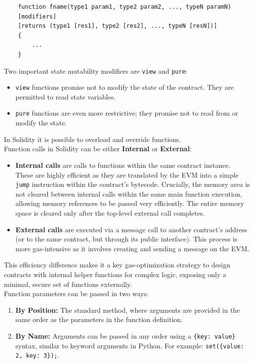 \documentclass{scrbook}
\begin{document}
\begin{lstlisting}
    function fname(type1 param1, type2 param2, ..., typeN paramN)
    [modifiers]
    [returns (type1 [res1], type2 [res2], ..., typeN [resN])]
    {
        ...
    }
\end{lstlisting}

Two important state mutability modifiers are \texttt{view} and \texttt{pure}:

\begin{itemize}
    \item \texttt{view} functions promise not to modify the state of the contract. They are permitted to read state variables.
    \item \texttt{pure} functions are even more restrictive; they promise not to read from or modify the state.
\end{itemize}

In Solidity it is possible to overload and override functions.\\

Function calls in Solidity can be either \textbf{Internal} or \textbf{External}:

\begin{itemize}
    \item \textbf{Internal calls} are calls to functions within the same contract instance. These are highly efficient as they are translated by the EVM into a simple \texttt{jump} instruction within the contract's bytecode. Crucially, the memory area is not cleared between internal calls within the same main function execution, allowing memory references to be passed very efficiently. The entire memory space is cleared only after the top-level external call completes.
    
    \item \textbf{External calls} are executed via a message call to another contract's address (or to the same contract, but through its public interface). This process is more gas-intensive as it involves creating and sending a message on the EVM.
\end{itemize}

This efficiency difference makes it a key gas-optimization strategy to design contracts with internal helper functions for complex logic, exposing only a minimal, secure set of functions externally.\\

Function parameters can be passed in two ways:

\begin{enumerate}
    \item \textbf{By Position:} The standard method, where arguments are provided in the same order as the parameters in the function definition.
    
    \item \textbf{By Name:} Arguments can be passed in any order using a \texttt{\{key: value\}} syntax, similar to keyword arguments in Python. For example: \texttt{set(\{value: 2, key: 3\});}.
\end{enumerate}
\end{document}
